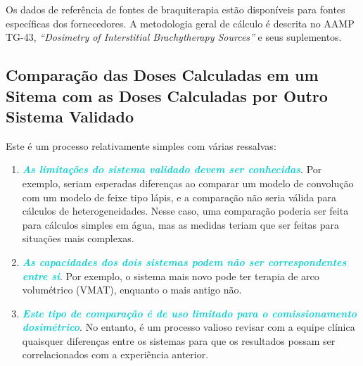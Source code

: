 \documentclass[11pt,a4paper]{article}
\newcounter{exemplo}
\begin{document}
	Os dados de referência de fontes de braquiterapia estão disponíveis para fontes específicas dos fornecedores. A metodologia geral de cálculo é descrita no AAMP TG-43, \textit{``Dosimetry of Interstitial Brachytherapy Sources''} e seus suplementos.

\subsection*{Comparação das Doses Calculadas em um Sitema com as Doses Calculadas por Outro Sistema Validado}

	Este é um processo relativamente simples com várias ressalvas:
	
	\begin{enumerate}[label=\textcolor{CarnationPink}{\arabic*${}^\circ $}]
		\item \textcolor{DarkTurquoise}{\textbf{\textit{As limitações do sistema validado devem ser conhecidas}}}. Por exemplo, seriam esperadas diferenças ao comparar um modelo de convolução com um modelo de feixe tipo lápis, e a comparação não seria válida para cálculos de heterogeneidades. Nesse caso, uma comparação poderia ser feita para cálculos simples em água, mas as medidas teriam que ser feitas para situações mais complexas.
		\item \textcolor{DarkTurquoise}{\textbf{\textit{As capacidades dos dois sistemas podem não ser correspondentes entre si}}}. Por exemplo, o sistema mais novo pode ter terapia de arco volumétrico (VMAT), enquanto o mais antigo não.
		\item \textcolor{DarkTurquoise}{\textbf{\textit{Este tipo de comparação é de uso limitado para o comissionamento dosimétrico}}}. No entanto, é um processo valioso revisar com a equipe clínica quaisquer diferenças entre os sistemas para que os resultados possam ser correlacionados com a experiência anterior. 
	\end{enumerate}
	
\end{document}
